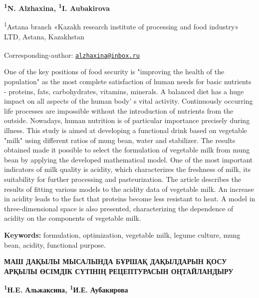 
\begin{articleheader}

{\bfseries \textsuperscript{1}N. Alzhaxina\textsuperscript{\envelope },
\textsuperscript{1}I. Aubakirova}
\end{articleheader}

\begin{affiliation}
\textsuperscript{1}Astana branch «Kazakh research institute of
processing and food industry» LTD, Astana, Kazakhstan

\raggedright {\bfseries \textsuperscript{\envelope }}Corresponding-author: \href{mailto:alzhaxina@inbox.ru}{\nolinkurl{alzhaxina@inbox.ru}}
\end{affiliation}

One of the key positions of food security is "improving the health of
the population" as the most complete satisfaction of human needs for
basic nutrients - proteins, fats, carbohydrates, vitamins, minerals. A
balanced diet has a huge impact on all aspects of the human
body' s vital activity. Continuously occurring life
processes are impossible without the introduction of nutrients from the
outside. Nowadays, human nutrition is of particular importance precisely
during illness. This study is aimed at developing a functional drink
based on vegetable "milk" using different ratios of mung bean, water and
stabilizer. The results obtained made it possible to select the
formulation of vegetable milk from mung bean by applying the developed
mathematical model. One of the most important indicators of milk quality
is acidity, which characterizes the freshness of milk, its suitability
for further processing and pasteurization. The article describes the
results of fitting various models to the acidity data of vegetable milk.
An increase in acidity leads to the fact that proteins become less
resistant to heat. A model in three-dimensional space is also presented,
characterizing the dependence of acidity on the components of vegetable
milk.

{\bfseries Keywords:} formulation, optimization, vegetable milk, legume
culture, mung bean, acidity, functional purpose.

\begin{articleheader}
{\bfseries МАШ ДАҚЫЛЫ МЫСАЛЫНДА БҰРШАҚ ДАҚЫЛДАРЫН ҚОСУ АРҚЫЛЫ ӨСІМДІК
СҮТІНІҢ РЕЦЕПТУРАСЫН ОҢТАЙЛАНДЫРУ}

{\bfseries \textsuperscript{1}Н.E. Альжаксина\textsuperscript{\envelope },
\textsuperscript{1}И.Е. Аубакирова}
\end{articleheader}

